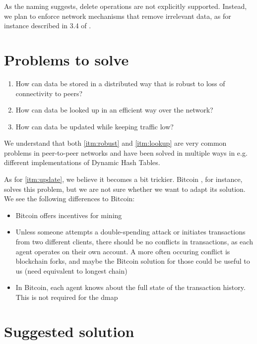 \documentclass[a4paper, 10pt, conference]{ieeeconf}
\begin{document}
As the naming suggests, delete operations are not explicitly supported. Instead,
we plan to enforce network mechanisms that remove irrelevant data, as for
instance described in 3.4 of \cite{freenet}.

\section{Problems to solve}

\begin{enumerate}
  \itemsep0em
  \item \label{itm:robust} How can data be stored in a distributed way that is
    robust to loss of connectivity to peers?
  \item \label{itm:lookup} How can data be looked up in an efficient way over
    the network?
  \item \label{itm:update} How can data be updated while keeping traffic low?
\end{enumerate}

We understand that both \ref{itm:robust} and \ref{itm:lookup} are very common
problems in peer-to-peer networks and have been solved in multiple ways in
e.g. different implementations of Dynamic Hash Tables.

As for \ref{itm:update}, we believe it becomes a bit trickier. Bitcoin 
\cite{bitcoin}, for instance, solves this problem, but we are not sure whether
we want to adapt its solution. We see the following differences to Bitcoin:

\begin{itemize}
  \itemsep0em
  \item Bitcoin offers incentives for mining
  \item Unless someone attempts a double-spending attack or initiates
    transactions from two different clients, there should be no conflicts in
    transactions, as each agent operates on their own account. A more often 
    occuring conflict is blockchain forks, and maybe the Bitcoin solution for 
    those could be useful to us (need equivalent to longest chain)
  \item In Bitcoin, each agent knows about the full state of the transaction
    history. This is not required for the dmap
\end{itemize}

\section{Suggested solution}
\end{document}
